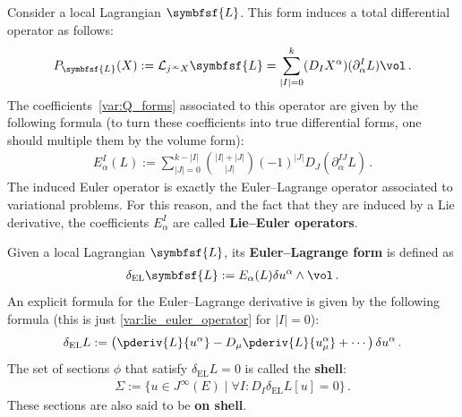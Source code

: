     \begin{example}
        Consider a local Lagrangian $\symbfsf{L}$. This form induces a total differential operator as follows:
        \begin{gather}
            P_{\symbfsf{L}}(X) := \mathcal{L}_{j^\infty X}\symbfsf{L} = \sum_{|I|=0}^k(D_IX^\alpha)(\partial^I_\alpha L)\vol\,.
        \end{gather}
        The coefficients~\eqref{var:Q_forms} associated to this operator are given by the following formula (to turn these coefficients into true differential forms, one should multiple them by the volume form):
        \begin{gather}
            \label{var:lie_euler_operator}
            E^I_\alpha(L) := \sum_{|J|=0}^{k-|I|}\binom{|I|+|J|}{|J|}(-1)^{|J|}D_J\left(\partial^{IJ}_\alpha L\right)\,.
        \end{gather}
        The induced Euler operator is exactly the Euler--Lagrange operator associated to variational problems. For this reason, and the fact that they are induced by a Lie derivative, the coefficients $E^I_\alpha$ are called \textbf{Lie--Euler operators}.

        Given a local Lagrangian $\symbfsf{L}$, its \textbf{Euler--Lagrange form} is defined as
        \begin{gather}
            \delta_{\text{EL}}\symbfsf{L} := E_\alpha(L)\delta u^\alpha\wedge\vol\,.
        \end{gather}
        An explicit formula for the Euler--Lagrange derivative is given by the following formula (this is just \cref{var:lie_euler_operator} for $|I|=0$):
        \begin{gather}
            \label{var:euler_lagrange_derivative}
            \delta_{\text{EL}}L := \left(\pderiv{L}{u^\alpha} - D_\mu\pderiv{L}{u^\alpha_\mu} + \cdots\right)\delta u^\alpha\,.
        \end{gather}
        The set of sections $\phi$ that satisfy $\delta_{\text{EL}}L=0$ is called the \textbf{shell}:
        \begin{gather}
            \Sigma := \{u\in J^\infty(E)\mid\forall I:D_I\delta_{\text{EL}}L[u] = 0\}\,.
        \end{gather}
        These sections are also said to be \textbf{on shell}.
    \end{example}

